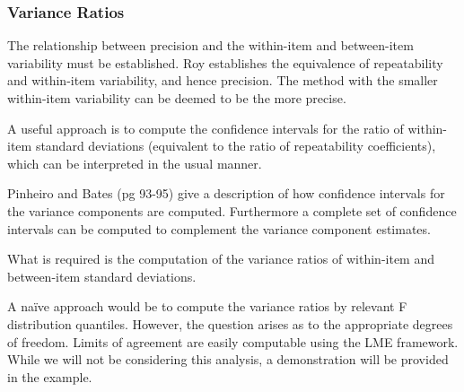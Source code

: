 \documentclass[12pt, a4paper]{report}
\theoremstyle{plain}
\theoremstyle{definition}
\theoremstyle{remark}
\begin{document}
	
	

	\subsubsection{Variance Ratios}

	The relationship between precision and the within-item and between-item variability must be established. Roy establishes the equivalence of repeatability and within-item variability, and hence precision.  The method with the smaller within-item variability can be deemed to be the more precise.
	
	A useful approach is to compute the confidence intervals for the ratio of within-item standard deviations (equivalent to the ratio of repeatability coefficients), which can be interpreted in the usual manner.
%	
	
	Pinheiro and Bates (pg 93-95) give a description of how confidence intervals for the variance components are computed. Furthermore a complete set of confidence intervals can be computed to complement the variance component estimates.
	
	What is required is the computation of the variance ratios of within-item and between-item standard deviations.
	
	A naïve approach would be to compute the variance ratios by relevant F distribution quantiles. However, the question arises as to the appropriate degrees of freedom.
	Limits of agreement are easily computable using the LME framework. While we will not be considering this analysis, a demonstration will be provided in the example.
	
	
	
	
	
\end{document}
